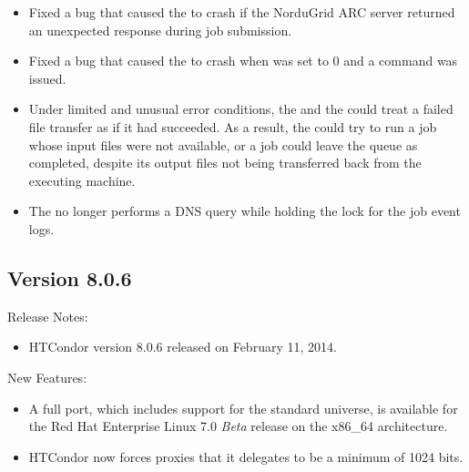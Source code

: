 \begin{itemize}
\item Fixed a bug that caused the  to crash if
the NorduGrid ARC server returned an unexpected response during job
submission.

\item Fixed a bug that caused the  to crash when
 was set to 0 and a  command was
issued.

\item Under limited and unusual error conditions,
the  and the  could treat a failed 
file transfer as if it had succeeded.
As a result, the  could try to run a job whose input
files were not available, 
or a job could leave the queue as completed,
despite its output files not being transferred back from the executing
machine.

\item The  no longer performs a DNS query while holding
the lock for the job event logs.

\end{itemize}

\subsection*{\label{sec:New-8-0-6}Version 8.0.6}

\noindent Release Notes:

\begin{itemize}

\item HTCondor version 8.0.6 released on February 11, 2014.

\end{itemize}


\noindent New Features:

\begin{itemize}

\item A full port, which includes support for the standard universe,
is available for the Red Hat Enterprise Linux 7.0 \emph{Beta} release
on the x86\_64 architecture.

\item HTCondor now forces proxies that it delegates 
to be a minimum of 1024 bits.

\end{itemize}


